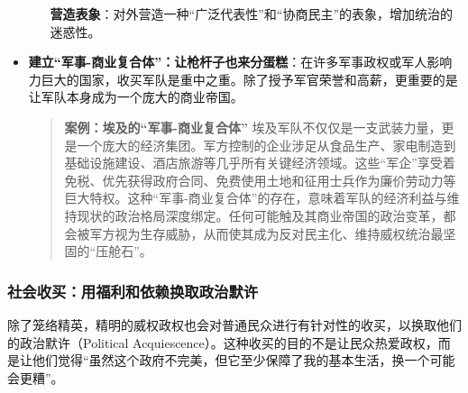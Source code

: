 \begin{itemize}
\begin{enumerate}
        \textbf{营造表象}：对外营造一种“广泛代表性”和“协商民主”的表象，增加统治的迷惑性。
    \end{enumerate}
    \item \textbf{建立“军事-商业复合体”：让枪杆子也来分蛋糕}：在许多军事政权或军人影响力巨大的国家，收买军队是重中之重。除了授予军官荣誉和高薪，更重要的是让军队本身成为一个庞大的商业帝国。
    \begin{quote}
    \textbf{案例：埃及的“军事-商业复合体”}
    埃及军队不仅仅是一支武装力量，更是一个庞大的经济集团。军方控制的企业涉足从食品生产、家电制造到基础设施建设、酒店旅游等几乎所有关键经济领域。这些“军企”享受着免税、优先获得政府合同、免费使用土地和征用士兵作为廉价劳动力等巨大特权。这种“军事-商业复合体”的存在，意味着军队的经济利益与维持现状的政治格局深度绑定。任何可能触及其商业帝国的政治变革，都会被军方视为生存威胁，从而使其成为反对民主化、维持威权统治最坚固的“压舱石”。
    \end{quote}
\end{itemize}

\subsubsection*{社会收买：用福利和依赖换取政治默许}

除了笼络精英，精明的威权政权也会对普通民众进行有针对性的收买，以换取他们的政治默许（Political Acquiescence）。这种收买的目的不是让民众热爱政权，而是让他们觉得“虽然这个政府不完美，但它至少保障了我的基本生活，换一个可能会更糟”。

